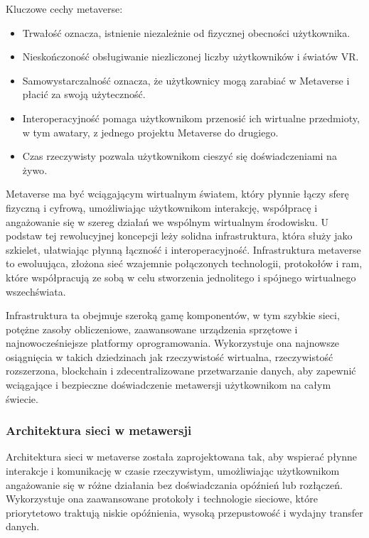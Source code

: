 Kluczowe cechy metaverse:

\begin{itemize}
    \item Trwałość oznacza, istnienie niezależnie od fizycznej obecności użytkownika\cite{metaverseAFullDive}.
    \item Nieskończoność obsługiwanie niezliczonej liczby użytkowników i światów VR\cite{metaverseAFullDive}.
    \item Samowystarczalność oznacza, że użytkownicy mogą zarabiać w Metaverse i płacić za swoją użyteczność\cite{metaverseAFullDive}.
    \item Interoperacyjność pomaga użytkownikom przenosić ich wirtualne przedmioty, w tym awatary, z jednego projektu Metaverse do drugiego\cite{metaverseAFullDive}.
    \item Czas rzeczywisty pozwala użytkownikom cieszyć się doświadczeniami na żywo\cite{metaverseAFullDive}.
\end{itemize}


Metaverse ma być wciągającym wirtualnym światem, który płynnie łączy sferę fizyczną i cyfrową, umożliwiając użytkownikom interakcję, współpracę i angażowanie się w szereg działań we wspólnym wirtualnym środowisku. U podstaw tej rewolucyjnej koncepcji leży solidna infrastruktura, która służy jako szkielet, ułatwiając płynną łączność i interoperacyjność. Infrastruktura metaverse to ewoluująca, złożona sieć wzajemnie połączonych technologii, protokołów i ram, które współpracują ze sobą w celu stworzenia jednolitego i spójnego wirtualnego wszechświata\cite{metaverseInfrastructureIEEE}.

Infrastruktura ta obejmuje szeroką gamę komponentów, w tym szybkie sieci, potężne zasoby obliczeniowe, zaawansowane urządzenia sprzętowe i najnowocześniejsze platformy oprogramowania. Wykorzystuje ona najnowsze osiągnięcia w takich dziedzinach jak rzeczywistość wirtualna, rzeczywistość rozszerzona, blockchain i zdecentralizowane przetwarzanie danych, aby zapewnić wciągające i bezpieczne doświadczenie metawersji użytkownikom na całym świecie\cite{metaverseInfrastructureIEEE}.

\subsubsection{Architektura sieci w metawersji}

Architektura sieci w metaverse została zaprojektowana tak, aby wspierać płynne interakcje i komunikację w czasie rzeczywistym, umożliwiając użytkownikom angażowanie się w różne działania bez doświadczania opóźnień lub rozłączeń. Wykorzystuje ona zaawansowane protokoły i technologie sieciowe, które priorytetowo traktują niskie opóźnienia, wysoką przepustowość i wydajny transfer danych\cite{metaverseInfrastructureIEEE}.

